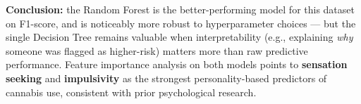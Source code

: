 \documentclass[11pt]{article}
\begin{document}
\textbf{Conclusion:} the Random Forest is the better-performing model
for this dataset on F1-score, and is noticeably more robust to
hyperparameter choices --- but the single Decision Tree remains valuable
when interpretability (e.g., explaining \emph{why} someone was flagged
as higher-risk) matters more than raw predictive performance. Feature
importance analysis on both models points to \textbf{sensation seeking}
and \textbf{impulsivity} as the strongest personality-based predictors
of cannabis use, consistent with prior psychological research.


    
    
    
\end{document}
